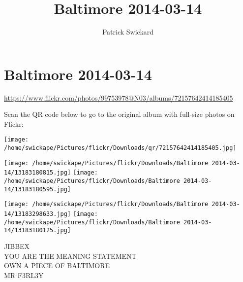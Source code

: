 \documentclass[10pt,letterpaper]{article}
\title{Baltimore 2014-03-14}
\author{Patrick Swickard}
\date{}
\begin{document}
\section*{Baltimore 2014-03-14}

\url{https://www.flickr.com/photos/99753978@N03/albums/72157642414185405}

Scan the QR code below to go to the original album with full-size photos on Flickr:

\texttt{[image: /home/swickape/Pictures/flickr/Downloads/qr/72157642414185405.jpg]}
\pagebreak

\texttt{[image: /home/swickape/Pictures/flickr/Downloads/Baltimore 2014-03-14/13183180815.jpg]}
\texttt{[image: /home/swickape/Pictures/flickr/Downloads/Baltimore 2014-03-14/13183180595.jpg]}

\texttt{[image: /home/swickape/Pictures/flickr/Downloads/Baltimore 2014-03-14/13183298633.jpg]}
\texttt{[image: /home/swickape/Pictures/flickr/Downloads/Baltimore 2014-03-14/13183180125.jpg]}

JIBBEX\\
YOU ARE THE MEANING STATEMENT\\
OWN A PIECE OF BALTIMORE\\
MR F3RL3Y
\pagebreak
\end{document}
